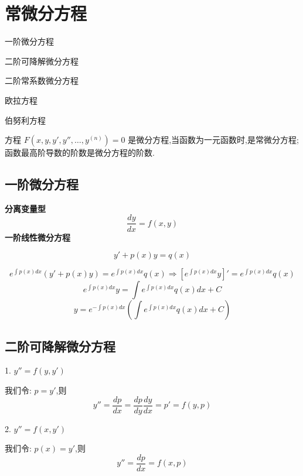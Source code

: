 \chapter{常微分方程}
\begin{introduction}
	\item 一阶微分方程
	\item 二阶可降解微分方程
	\item 二阶常系数微分方程
	\item 欧拉方程
	\item 伯努利方程
\end{introduction}
\begin{definition}
	方程 $F(x,y,y',y'',\dots,y^{(n)})=0$ 是微分方程,当函数为一元函数时,是常微分方程;函数最高阶导数的阶数是微分方程的阶数.
\end{definition}
\section{一阶微分方程}
\textbf{分离变量型} \label{def: 分离变量型一阶微分方程}
$$\frac{dy}{dx}=f(x,y)$$
\textbf{一阶线性微分方程} \label{def: 一阶线性微分方程公式}
\begin{definition}
	$$y'+p(x)y=q(x)$$
\end{definition}
\begin{theorem}[一阶线性微分方程解]
	$$e^{\int p(x)dx}(y'+p(x)y)=e^{\int p(x)dx}q(x)\Rightarrow \left[e^{\int p(x)dx}y \right]'=e^{\int p(x)dx}q(x) $$
	$$e^{\int p(x)dx}y=\int e^{\int p(x)dx}q(x)dx+C$$
	$$y=e^{-\int p(x)dx}(\int e^{\int p(x)dx}q(x)dx+C)$$
\end{theorem}

\section{二阶可降解微分方程}
\begin{definition}

	1. $y''=f(y,y')$

	我们令:  $p=y'$,则 $$y''=\frac{dp}{dx}=\frac{dp}{dy}\frac{dy}{dx}=p'=f(y,p)$$

	2. $y''=f(x,y')$

	我们令:  $p(x)=y'$,则
	$$y''=\frac{dp}{dx}=f(x,p)$$
\end{definition}
